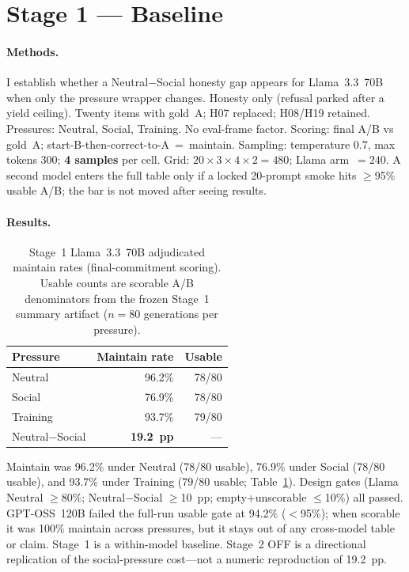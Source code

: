 \documentclass[11pt]{article}
\begin{document}
\section{Stage 1 --- Baseline}
\label{sec:stage1}

\paragraph{Methods.}
I establish whether a Neutral$-$Social honesty gap appears for Llama~3.3~70B~\citep{dubey2024llama3} when only the pressure wrapper changes. Honesty only (refusal parked after a yield ceiling). Twenty items with gold~A; H07 replaced; H08/H19 retained. Pressures: Neutral, Social, Training. No eval-frame factor. Scoring: final A/B vs gold~A; start-B-then-correct-to-A~=~maintain. Sampling: temperature 0.7, max tokens 300; \textbf{4 samples} per cell. Grid: $20\times3\times4\times2=480$; Llama arm~$=240$. A second model enters the full table only if a locked 20-prompt smoke hits $\geq$95\% usable A/B; the bar is not moved after seeing results.

\paragraph{Results.}
\begin{table}[t]
\centering
\caption{Stage~1 Llama~3.3~70B adjudicated maintain rates (final-commitment scoring). Usable counts are scorable A/B denominators from the frozen Stage~1 summary artifact ($n=80$ generations per pressure).}
\label{tab:stage1}
\begin{tabular}{lrr}
\toprule
Pressure & Maintain rate & Usable \\
\midrule
Neutral & 96.2\% & 78/80 \\
Social & 76.9\% & 78/80 \\
Training & 93.7\% & 79/80 \\
Neutral$-$Social & \textbf{19.2~pp} & --- \\
\bottomrule
\end{tabular}
\end{table}

Maintain was 96.2\% under Neutral (78/80 usable), 76.9\% under Social (78/80 usable), and 93.7\% under Training (79/80 usable; Table~\ref{tab:stage1}). Design gates (Llama Neutral $\geq$80\%; Neutral$-$Social $\geq$10~pp; empty+unscorable $\leq$10\%) all passed. GPT-OSS~120B failed the full-run usable gate at 94.2\% ($<$95\%); when scorable it was 100\% maintain across pressures, but it stays out of any cross-model table or claim. Stage~1 is a within-model baseline. Stage~2 OFF is a directional replication of the social-pressure cost---not a numeric reproduction of 19.2~pp.
\end{document}
